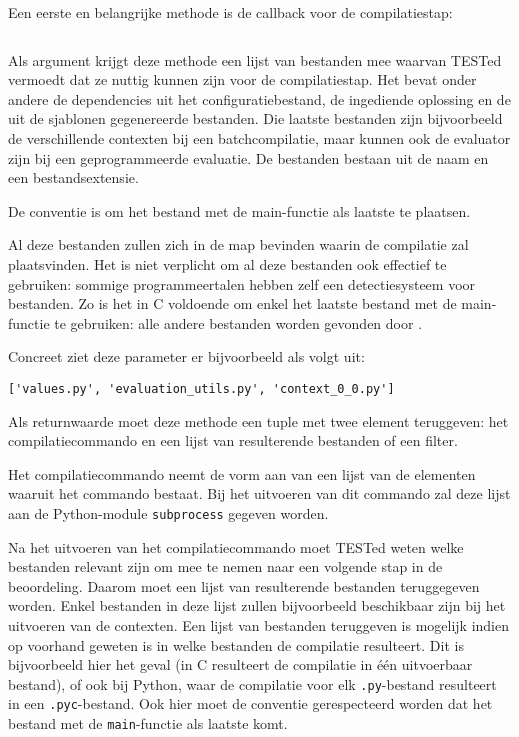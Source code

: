 Een eerste en belangrijke methode is de callback voor de compilatiestap:

\inputminted[firstline=11,lastline=16,gobble=4]{python}{sources/c-config.py}

Als argument krijgt deze methode een lijst van bestanden mee waarvan TESTed vermoedt dat ze nuttig kunnen zijn voor de compilatiestap.
Het bevat onder andere de dependencies uit het configuratiebestand, de ingediende oplossing en de uit de sjablonen gegenereerde bestanden.
Die laatste bestanden zijn bijvoorbeeld de verschillende contexten bij een batchcompilatie, maar kunnen ook de evaluator zijn bij een geprogrammeerde evaluatie.
De bestanden bestaan uit de naam en een bestandsextensie.

De conventie is om het bestand met de main-functie als laatste te plaatsen.

Al deze bestanden zullen zich in de map bevinden waarin de compilatie zal plaatsvinden.
Het is niet verplicht om al deze bestanden ook effectief te gebruiken: sommige programmeertalen hebben zelf een detectiesysteem voor bestanden.
Zo is het in C voldoende om enkel het laatste bestand met de main-functie te gebruiken: alle andere bestanden worden gevonden door .

Concreet ziet deze parameter er bijvoorbeeld als volgt uit:

\begin{verbatim}
['values.py', 'evaluation_utils.py', 'context_0_0.py']
\end{verbatim}

Als returnwaarde moet deze methode een tuple met twee element teruggeven: het compilatiecommando en een lijst van resulterende bestanden of een filter.

Het compilatiecommando neemt de vorm aan van een lijst van de elementen waaruit het commando bestaat.
Bij het uitvoeren van dit commando zal deze lijst aan de Python-module \texttt{subprocess} gegeven worden.

Na het uitvoeren van het compilatiecommando moet TESTed weten welke bestanden relevant zijn om mee te nemen naar een volgende stap in de beoordeling.
Daarom moet een lijst van resulterende bestanden teruggegeven worden.
Enkel bestanden in deze lijst zullen bijvoorbeeld beschikbaar zijn bij het uitvoeren van de contexten.
Een lijst van bestanden teruggeven is mogelijk indien op voorhand geweten is in welke bestanden de compilatie resulteert.
Dit is bijvoorbeeld hier het geval (in C resulteert de compilatie in één uitvoerbaar bestand), of ook bij Python, waar de compilatie voor elk \texttt{.py}-bestand resulteert in een \texttt{.pyc}-bestand.
Ook hier moet de conventie gerespecteerd worden dat het bestand met de \texttt{main}-functie als laatste komt.

